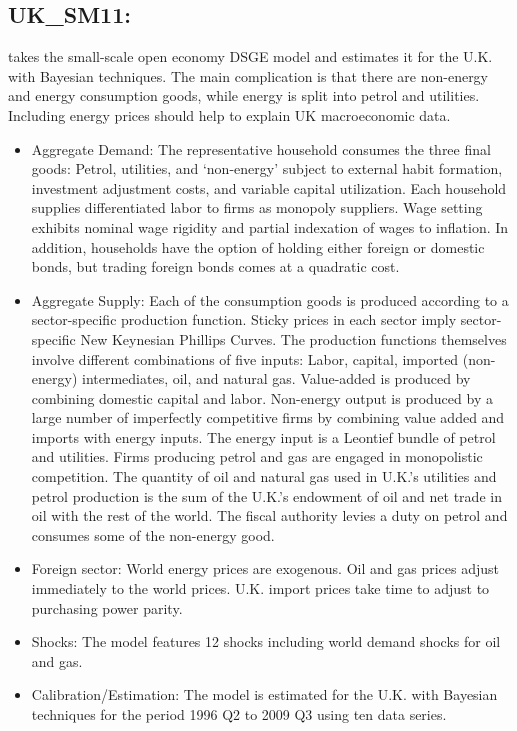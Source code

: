 \documentclass[11pt,a4paper]{article}
\begin{document}
	\subsection{UK\_SM11: \cite{millard2011estimated}}
\label{UKSM11}
\cite{millard2011estimated} takes the small-scale open economy DSGE model and estimates it for the U.K. with Bayesian techniques. The main complication is that there are non-energy and energy consumption goods, while energy is split into petrol and utilities. Including energy prices should help to explain UK macroeconomic data.
\begin{itemize}
\item Aggregate Demand: The representative household consumes the three final goods: Petrol, utilities, and ‘non-energy’ subject to external habit formation, investment adjustment costs, and variable capital utilization. Each household supplies differentiated labor to firms as monopoly suppliers. Wage setting exhibits nominal wage rigidity and partial indexation of wages to inflation. In addition, households have the option of holding either foreign or domestic bonds, but trading foreign bonds comes at a quadratic cost. 

\item Aggregate Supply: Each of the consumption goods is produced according to a sector-specific production function. Sticky prices in each sector imply sector-specific New Keynesian Phillips Curves. The production functions themselves involve different combinations of five inputs: Labor, capital, imported (non-energy) intermediates, oil, and natural gas. Value-added is produced by combining domestic capital and labor. Non-energy output is produced by a large number of imperfectly competitive firms by combining value added and imports with energy inputs. The energy input is a Leontief bundle of petrol and utilities. Firms producing petrol and gas are engaged in monopolistic competition. The quantity of oil and natural gas used in U.K.’s utilities and petrol production is the sum of the U.K.’s endowment of oil and net trade in oil with the rest of the world. The fiscal authority levies a duty on petrol and consumes some of the non-energy good.

\item Foreign sector: World energy prices are exogenous. Oil and gas prices adjust immediately to the world prices. U.K. import prices take time to adjust to purchasing power parity.

\item Shocks: The model features 12 shocks including world demand shocks for oil and gas.

\item Calibration/Estimation: The model is estimated for the U.K. with Bayesian techniques for the period 1996 Q2 to 2009 Q3 using ten data series.
\end{itemize}
	
\end{document}
